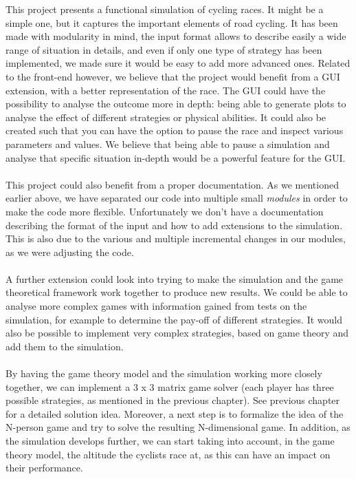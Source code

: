 \documentclass[10pt, a4paper]{report}
\begin{document}



This project presents a functional simulation of cycling races. It might be a simple one, but it captures the important elements of road cycling. It has been made with modularity in mind, the input format allows to describe easily a wide range of situation in details, and even if only one type of strategy has been implemented, we made sure it would be easy to add more advanced ones. Related to the front-end however, we believe that the project would benefit from a GUI extension, with a better representation of the race. The GUI could have the possibility to analyse the outcome more in depth: being able to generate plots to analyse the effect of different strategies or physical abilities. It could also be created such that you can have the option to pause the race and inspect various parameters and values. We believe that being able to pause a simulation and analyse that specific situation in-depth would be a powerful feature for the GUI.
\\\\
This project could also benefit from a proper documentation. As we mentioned earlier above, we have separated our code into multiple small \textit{modules} in order to make the code more flexible. Unfortunately we don't have a documentation describing the format of the input and how to add extensions to the simulation. This is also due to the various and multiple incremental changes in our modules, as we were adjusting the code.\\\\
A further extension could look into trying to make the simulation and the game theoretical framework work together to produce new results. We could be able to analyse more complex games with information gained from tests on the simulation, for example to determine the pay-off of different strategies. It would also be possible to implement very complex strategies, based on game theory and add them to the simulation. \\\\
By having the game theory model and the simulation working more closely together, we can implement a 3 x 3 matrix game solver (each player has three possible strategies, as mentioned in the previous chapter). See previous chapter for a detailed solution idea. Moreover, a next step is to formalize the idea of the N-person game and try to solve the resulting N-dimensional game. In addition, as the simulation develops further, we can start taking into account, in the game theory model, the altitude the cyclists race at, as this can have an impact on their performance.
\end{document}
